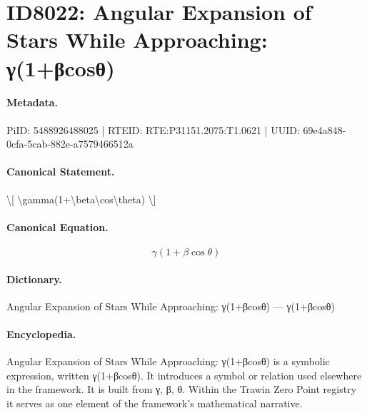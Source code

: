 \section*{ID8022: Angular Expansion of Stars While Approaching: γ(1+βcosθ)}
\paragraph{Metadata.}
PiID: 5488926488025 | RTEID: RTE:P31151.2075:T1.0621 | UUID: 69e4a848-0cfa-5cab-882e-a7579466512a

\paragraph{Canonical Statement.}
\textbackslash{}[ \textbackslash{}gamma(1+\textbackslash{}beta\textbackslash{}cos\textbackslash{}theta) \textbackslash{}]

\paragraph{Canonical Equation.}
\[
\gamma(1+\beta\cos\theta)
\]

\paragraph{Dictionary.}
Angular Expansion of Stars While Approaching: γ(1+βcosθ) — γ(1+βcosθ)

\paragraph{Encyclopedia.}
Angular Expansion of Stars While Approaching: γ(1+βcosθ) is a symbolic expression, written γ(1+βcosθ). It introduces a symbol or relation used elsewhere in the framework. It is built from γ, β, θ. Within the Trawin Zero Point registry it serves as one element of the framework's mathematical narrative.
